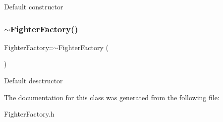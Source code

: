 Default constructor \mbox{\label{classFighterFactory_a499708d032968c812916d5b7d1188c37}} 
\subsubsection{\texorpdfstring{$\sim$\+Fighter\+Factory()}{~FighterFactory()}}
{\footnotesize\ttfamily Fighter\+Factory\+::$\sim$\+Fighter\+Factory (\begin{DoxyParamCaption}{ }\end{DoxyParamCaption})}

Default desctructor 

The documentation for this class was generated from the following file\+:\begin{DoxyCompactItemize}
\item 
Fighter\+Factory.\+h\end{DoxyCompactItemize}
